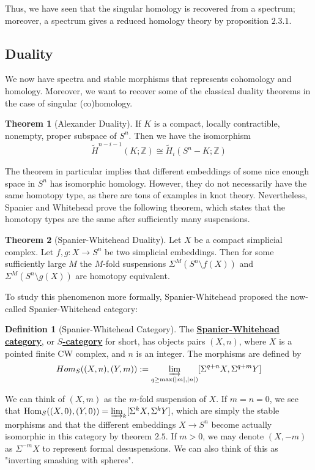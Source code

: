 \documentclass{article}
\theoremstyle{definition}
\newtheorem{theorem}{Theorem}[section]
\theoremstyle{definition}
\newtheorem{definition}{Definition}[theorem]
\theoremstyle{definition}
\theoremstyle{definition}
\theoremstyle{definition}
\theoremstyle{definition}
\theoremstyle{definition}
\begin{document}
Thus, we have seen that the singular homology is recovered from a spectrum; moreover, a spectrum gives a reduced homology theory by proposition $2.3.1$. 


\subsection{Duality}
We now have spectra and stable morphisms that represents cohomology and homology. Moreover, we want to recover some of the classical duality theorems in the case of singular (co)homology. 

\begin{tcolorbox}[colback=red!5!white,colframe=red!30!white]
\begin{theorem}[Alexander Duality]
If $K$ is a compact, locally contractible, nonempty, proper subspace of $S^n$. Then we have the isomorphism
\[\tilde{H}^{n-i-1}(K;\mathbb{Z})\cong \tilde{H}_i(S^n-K;\mathbb{Z})\] 
\end{theorem}
\end{tcolorbox}
The theorem in particular implies that different embeddings of some nice enough space in $S^n$ has isomorphic homology. However, they do not necessarily have the same homotopy type, as there are tons of examples in knot theory. Nevertheless, Spanier and Whitehead prove the following theorem, which states that the homotopy types are the same after sufficiently many suspensions. 

\begin{tcolorbox}[colback=red!5!white,colframe=red!30!white]
\begin{theorem}[Spanier-Whitehead Duality]
    Let $X$ be a compact simplicial complex. Let $f,g: X\to S^n$ be two simplicial embeddings. Then for some sufficiently large $M$ the $M$-fold suspensions $\Sigma^M (S^n\setminus f(X))$ and $\Sigma^M (S^n\setminus g(X))$ are homotopy equivalent.
\end{theorem}
\end{tcolorbox}
To study this phenomenon more formally, Spanier-Whitehead proposed the now-called Spanier-Whitehead category:


\begin{tcolorbox}[colback=purple!5!white,colframe=purple!75!black]
\begin{definition}[Spanier-Whitehead Category]
The \underline{\textbf{Spanier-Whitehead category}}, or \underline{\textbf{$S$-category}} for short, has objects pairs $(X,n)$, where $X$ is a pointed finite CW complex, and $n$ is an integer. The morphisms are defined by 
\[Hom_{S}((X,n),(Y,m)):=\varinjlim_{q\geq \textrm{max}(|m|,|n|)}[\Sigma^{q+n} X, \Sigma^{q+m} Y]\]
\end{definition}
\end{tcolorbox}
We can think of $(X,m)$ as the $m$-fold suspension of $X$. If $m=n=0$, we see that $\textrm{Hom}_S((X,0),(Y,0))=\varinjlim_{k}[\Sigma^k X, \Sigma^k Y]$, which are simply the stable morphisms and that the different embeddings $X\to S^n$ become actually isomorphic in this category by theorem $2.5$. If $m>0$, we may denote $(X,-m)$ as $\Sigma^{-m}X$ to represent formal desuspensions. We can also think of this as "inverting smashing with spheres".
\end{document}
